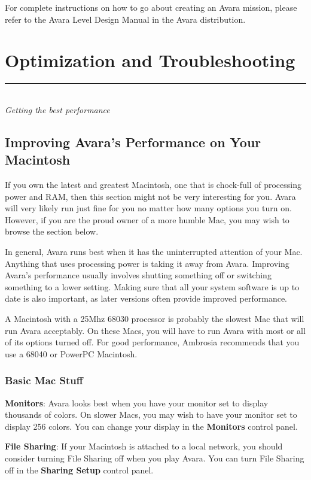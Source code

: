 \documentclass{article}
\let\oldsection\section
\renewcommand\section{\clearpage\oldsection}
\begin{document}
For complete instructions on how to go about creating an Avara mission, please refer to the Avara Level Design Manual in the Avara distribution.


\section{Optimization and Troubleshooting}
\rule{5.5cm}{.15pt}\\
\rmfamily\textit{Getting the best performance}

\subsection{Improving Avara's Performance on Your Macintosh}
If you own the latest and greatest Macintosh, one that is chock-full of processing power and RAM, then this section might not be very interesting for you. Avara will very likely run just fine for you no matter how many options you turn on. However, if you are the proud owner of a more humble Mac, you may wish to browse the section below.

In general, Avara runs best when it has the uninterrupted attention of your Mac. Anything that uses processing power is taking it away from Avara. Improving Avara's performance usually involves shutting something off or switching something to a lower setting. Making sure that all your system software is up to date is also important, as later versions often provide improved performance.

A Macintosh with a 25Mhz 68030 processor is probably the slowest Mac that will run Avara acceptably. On these Macs, you will have to run Avara with most or all of its options turned off. For good performance, Ambrosia recommends that you use a 68040 or PowerPC Macintosh.

\subsubsection{Basic Mac Stuff}
\textbf{Monitors}: Avara looks best when you have your monitor set to display thousands of colors. On slower Macs, you may wish to have your monitor set to display 256 colors. You can change your display in the \textbf{Monitors} control panel.

\textbf{File Sharing}: If your Macintosh is attached to a local network, you should consider turning File Sharing off when you play Avara. You can turn File Sharing off in the \textbf{Sharing Setup} control panel.
\end{document}
